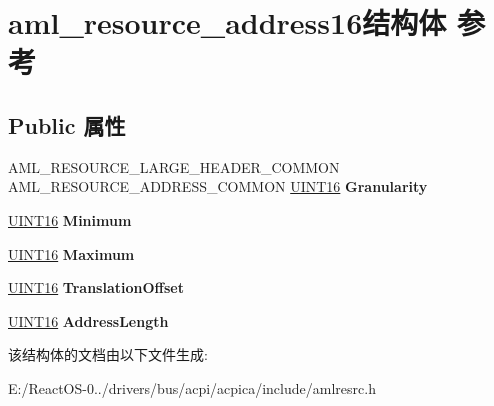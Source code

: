 \hypertarget{structaml__resource__address16}{}\section{aml\+\_\+resource\+\_\+address16结构体 参考}
\label{structaml__resource__address16}
\subsection*{Public 属性}
\begin{DoxyCompactItemize}
\item 
\mbox{\label{structaml__resource__address16_aabd88c296a41bd7648b52b905722b5f0}} 
A\+M\+L\+\_\+\+R\+E\+S\+O\+U\+R\+C\+E\+\_\+\+L\+A\+R\+G\+E\+\_\+\+H\+E\+A\+D\+E\+R\+\_\+\+C\+O\+M\+M\+ON A\+M\+L\+\_\+\+R\+E\+S\+O\+U\+R\+C\+E\+\_\+\+A\+D\+D\+R\+E\+S\+S\+\_\+\+C\+O\+M\+M\+ON \hyperlink{_processor_bind_8h_a09f1a1fb2293e33483cc8d44aefb1eb1}{U\+I\+N\+T16} {\bfseries Granularity}
\item 
\mbox{\label{structaml__resource__address16_a31696ed3afdbc8a7563f563351ba3e3d}} 
\hyperlink{_processor_bind_8h_a09f1a1fb2293e33483cc8d44aefb1eb1}{U\+I\+N\+T16} {\bfseries Minimum}
\item 
\mbox{\label{structaml__resource__address16_abfbf92789c59cba85b5fbbc8954f4433}} 
\hyperlink{_processor_bind_8h_a09f1a1fb2293e33483cc8d44aefb1eb1}{U\+I\+N\+T16} {\bfseries Maximum}
\item 
\mbox{\label{structaml__resource__address16_a0c19765c49c0768795f62c0ef7ad2d14}} 
\hyperlink{_processor_bind_8h_a09f1a1fb2293e33483cc8d44aefb1eb1}{U\+I\+N\+T16} {\bfseries Translation\+Offset}
\item 
\mbox{\label{structaml__resource__address16_a9ac13095d85310a4fa4282c78c10900a}} 
\hyperlink{_processor_bind_8h_a09f1a1fb2293e33483cc8d44aefb1eb1}{U\+I\+N\+T16} {\bfseries Address\+Length}
\end{DoxyCompactItemize}


该结构体的文档由以下文件生成\+:\begin{DoxyCompactItemize}
\item 
E\+:/\+React\+O\+S-\/0../drivers/bus/acpi/acpica/include/amlresrc.\+h\end{DoxyCompactItemize}
